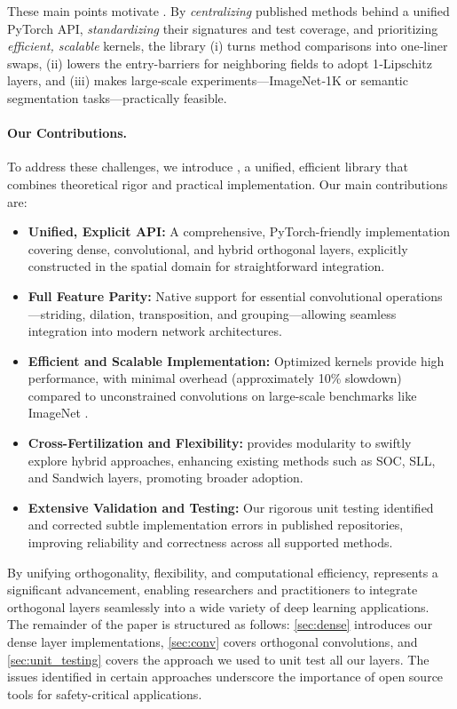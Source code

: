     These main points motivate \textbf{\Orthogonium}. By \textit{centralizing} published methods behind a unified PyTorch API, \textit{standardizing} their signatures and test coverage, and prioritizing \textit{efficient, scalable} kernels, the library (i) turns method comparisons into one‑liner swaps, (ii) lowers the entry-barriers for neighboring fields to adopt 1‑Lipschitz layers, and (iii) makes large‑scale experiments—ImageNet‑1K or semantic segmentation tasks—practically feasible.
    
    \paragraph{Our Contributions.}
    To address these challenges, we introduce \textbf{\Orthogonium}, a unified, efficient library that combines theoretical rigor and practical implementation. Our main contributions are:
    \begin{itemize}
    \item \textbf{Unified, Explicit API:} A comprehensive, PyTorch-friendly implementation covering dense, convolutional, and hybrid orthogonal layers, explicitly constructed in the spatial domain for straightforward integration.
    \item \textbf{Full Feature Parity:} Native support for essential convolutional operations—striding, dilation, transposition, and grouping—allowing seamless integration into modern network architectures.
    \item \textbf{Efficient and Scalable Implementation:} Optimized kernels provide high performance, with minimal overhead (approximately 10\% slowdown) compared to unconstrained convolutions on large-scale benchmarks like ImageNet \cite{deng2009imagenet}.
    \item \textbf{Cross-Fertilization and Flexibility:} \Orthogonium provides modularity to swiftly explore hybrid approaches, enhancing existing methods such as SOC, SLL, and Sandwich layers, promoting broader adoption.
    \item \textbf{Extensive Validation and Testing:} Our rigorous unit testing identified and corrected subtle implementation errors in published repositories, improving reliability and correctness across all supported methods.
    \end{itemize}
    
    By unifying orthogonality, flexibility, and computational efficiency, \Orthogonium represents a significant advancement, enabling researchers and practitioners to integrate orthogonal layers seamlessly into a wide variety of deep learning applications. The remainder of the paper is structured as follows: \cref{sec:dense} introduces our dense layer implementations, \cref{sec:conv} covers orthogonal convolutions, and \cref{sec:unit_testing} covers the approach we used to unit test all our layers. The issues identified in certain approaches underscore the importance of open source tools for safety-critical applications.
    
